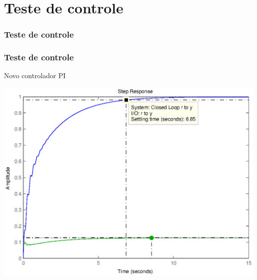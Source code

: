 \documentclass{beamer}
\begin{document}
\section{Teste de controle}
\begin{frame}
	\frametitle{Teste de controle}
		\begin{center}
		\end{center}
\end{frame}
\begin{frame}
	\frametitle{Teste de controle}
	\begin{block}{Novo controlador PI}
		\begin{center}
			\begin{center}
				\includegraphics[width=0.4\linewidth]{../bla0101}
			\end{center}
		\end{center}

	\end{block}
\end{frame}
\end{document}
